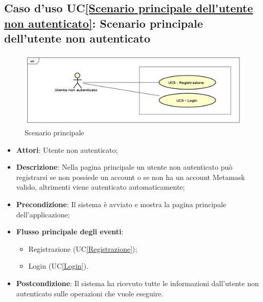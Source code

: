 \subsection{Caso d'uso UC\ref{Scenario principale dell'utente non autenticato}: Scenario principale dell'utente non autenticato}
\begin{figure} [H]
	\centering
	\includegraphics[scale=0.4]{./img/UseCaseDiagram01.png}
	\caption{Scenario principale }\label{}
\end{figure}
\begin{itemize}
	\item \textbf{Attori}: Utente non autenticato;
	\item \textbf{Descrizione}: Nella pagina principale un utente non autenticato può registrarsi se non possiede un account o se non ha un account Metamask valido, altrimenti viene autenticato automaticamente;
	\item \textbf{Precondizione}: Il sistema è avviato e mostra la pagina principale dell'applicazione;
	\item \textbf{Flusso principale degli eventi}: 
	\begin{itemize}
		\item Registrazione (UC\ref{Registrazione});
		\item Login (UC\ref{Login}).
	\end{itemize}
	\item \textbf{Postcondizione}: Il sistema ha ricevuto tutte le informazioni dall'utente non autenticato sulle operazioni che vuole eseguire.
\end{itemize}


